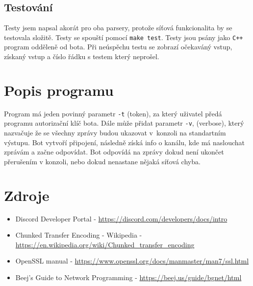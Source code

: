 \documentclass[a4paper,10pt]{article}
\begin{document}
\subsection{Testování}
Testy jsem napsal akorát pro oba parsery, protože síťová funkcionalita by se testovala složitě.
Testy se spouští pomocí \verb|make test|. Testy jsou psány jako \verb|C++| program odděleně od bota. Při neúspěchu testu se zobrazí očekaváný vstup, získaný vstup a číslo řádku s testem který neprošel. 

\section{Popis programu}
Program má jeden povinný parametr \verb|-t| (token), za který uživatel předá programu autorizační klíč bota. Dále může přidat parametr \verb|-v|, (verbose), který nazvačuje že se všechny zprávy budou ukazovat v~konzoli na standartním výstupu. Bot vytvoří připojení, následně získá info o kanálu, kde má naslouchat zprávám a začne odpovídat. Bot odpovídá na zprávy dokud není ukončet přerušením v konzoli, nebo dokud nenastane nějaká síťová chyba.

\section{Zdroje}
\begin{itemize}
\item Discord Developer Portal - \url{https://discord.com/developers/docs/intro}
\item Chunked Transfer Encoding - Wikipedia - \url{https://en.wikipedia.org/wiki/Chunked_transfer_encoding}
\item OpenSSL manual - \url{https://www.openssl.org/docs/manmaster/man7/ssl.html}
\item Beej's Guide to Network Programming - \url{https://beej.us/guide/bgnet/html}
\end{itemize}
\end{document}
